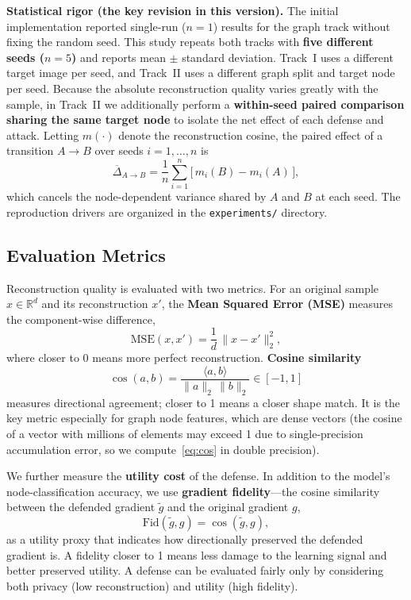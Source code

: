 \documentclass[conference]{IEEEtran}
\begin{document}
\textbf{Statistical rigor (the key revision in this version).} The initial
implementation reported single-run ($n{=}1$) results for the graph track without
fixing the random seed. This study repeats both tracks with \textbf{five
different seeds ($n{=}5$)} and reports mean $\pm$ standard deviation. Track~I uses
a different target image per seed, and Track~II uses a different graph split and
target node per seed. Because the absolute reconstruction quality varies greatly
with the sample, in Track~II we additionally perform a \textbf{within-seed paired
comparison sharing the same target node} to isolate the net effect of each
defense and attack. Letting $m(\cdot)$ denote the reconstruction cosine, the
paired effect of a transition $A\!\to\!B$ over seeds $i=1,\dots,n$ is
\begin{equation}
\overline{\Delta}_{A\to B}=\frac{1}{n}\sum_{i=1}^{n}
\big[\,m_i(B)-m_i(A)\,\big] ,
\label{eq:paired}
\end{equation}
which cancels the node-dependent variance shared by $A$ and $B$ at each seed. The
reproduction drivers are organized in the \texttt{experiments/} directory.

\subsection{Evaluation Metrics}
Reconstruction quality is evaluated with two metrics. For an original sample
$x\in\mathbb{R}^d$ and its reconstruction $x'$, the \textbf{Mean Squared Error
(MSE)} measures the component-wise difference,
\begin{equation}
\mathrm{MSE}(x,x')=\frac{1}{d}\,\|x-x'\|_2^2 ,
\label{eq:mse}
\end{equation}
where closer to 0 means more perfect reconstruction. \textbf{Cosine similarity}
\begin{equation}
\cos(a,b)=\frac{\langle a,b\rangle}{\|a\|_2\,\|b\|_2}\in[-1,1]
\label{eq:cos}
\end{equation}
measures directional agreement; closer to 1 means a closer shape match. It is the
key metric especially for graph node features, which are dense vectors (the
cosine of a vector with millions of elements may exceed 1 due to single-precision
accumulation error, so we compute~\eqref{eq:cos} in double precision).

We further measure the \textbf{utility cost} of the defense. In addition to the
model's node-classification accuracy, we use \textbf{gradient fidelity}---the
cosine similarity between the defended gradient $\tilde{g}$ and the original
gradient $g$,
\begin{equation}
\mathrm{Fid}(\tilde{g},g)=\cos(\tilde{g},g) ,
\label{eq:fidelity}
\end{equation}
as a utility proxy that indicates how directionally preserved the defended
gradient is. A fidelity closer to 1 means less damage to the learning signal and
better preserved utility. A defense can be evaluated fairly only by considering
both privacy (low reconstruction) and utility (high fidelity).
\end{document}
